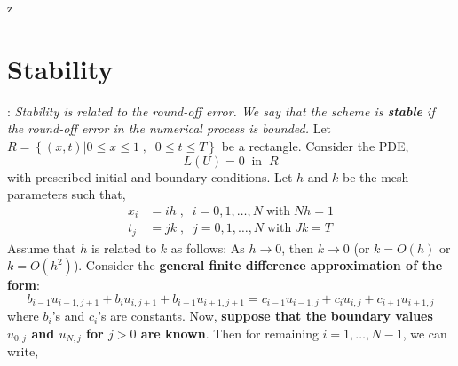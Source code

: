 z\documentclass[a4paper,12pt,twoside]{book}
\newcommand{\nll}[0]{\newline\newline}
\newcommand{\tit}[1]{\textit{#1}}
\newcommand{\defin}[0]{\boxed{\textbf{\textit{Definition}}}}
\begin{document}
\section{Stability}
\defin \;: \tit{Stability is related to the round-off error. We say that the scheme is \textbf{stable} if the round-off error in the numerical process is bounded.}
\nll
Let $R = \left\{ (x,t) \vert 0\le x\le 1\;,\;\; 0\le t\le T \right\}$ be a rectangle. Consider the PDE,
\[ L(U) = 0 \;\;\text{in}\;\;R\]
with prescribed initial and boundary conditions. 
\nll
Let $h$ and $k$ be the mesh parameters such that,
\begin{equation*}
    \begin{split}
        x_i &= ih\;,\;\;i=0,1,\dots,N\;\text{with}\;Nh=1\\
         t_j &= jk\;,\;\;j=0,1,\dots,N\;\text{with}\;Jk=T
    \end{split}
\end{equation*}
Assume that $h$ is related to $k$ as follows: As $h\to 0$, then $k\to 0$ (or $k=O(h)$ or $k=O(h^2)$).
\nll
Consider the \textbf{general finite difference approximation of the form}:
\begin{equation}
    b_{i-1}u_{i-1,j+1} + b_iu_{i,j+1} + b_{i+1}u_{i+1,j+1} = c_{i-1}u_{i-1,j} + c_iu_{i,j} + c_{i+1}u_{i+1,j}
\end{equation}
where $b_i$'s and $c_i$'s are constants.
\nll
Now, \textbf{suppose that the boundary values $u_{0,j}$ and $u_{N,j}$ for $j>0$ are known}. Then for remaining $i=1,\dots,N-1$, we can write,
\end{document}
